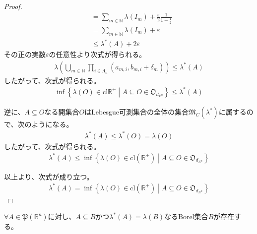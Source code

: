 \documentclass[dvipdfmx]{jsarticle}
\begin{document}
\begin{proof}
\begin{align*}
&= \sum_{m \in \mathbb{N}} {\lambda\left( I_{m} \right)} + \frac{\varepsilon}{2}\frac{1}{1 - \frac{1}{2}}\\
&= \sum_{m \in \mathbb{N}} {\lambda\left( I_{m} \right)} + \varepsilon\\
&\leq \lambda^{*}(A) + 2\varepsilon
\end{align*}
その正の実数$\varepsilon$の任意性より次式が得られる。
\begin{align*}
\lambda\left( \bigcup_{m \in \mathbb{N}} {\prod_{i \in \varLambda_{n}} \left( a_{m,i},b_{m,i} + \delta_{m} \right)} \right) \leq \lambda^{*}(A)
\end{align*}
したがって、次式が得られる。
\begin{align*}
\inf\left\{ \lambda(O) \in \mathrm{cl}\mathbb{R}^{+} \middle| A \subseteq O \in \mathfrak{O}_{d_{E^{n}}} \right\} \leq \lambda^{*}(A)
\end{align*}\par
逆に、$A \subseteq O$なる開集合$O$はLebesgue可測集合の全体の集合$\mathfrak{M}_{C}\left( \lambda^{*} \right)$に属するので、次のようになる。
\begin{align*}
\lambda^{*}(A) \leq \lambda^{*}(O) = \lambda(O)
\end{align*}
したがって、次式が得られる。
\begin{align*}
\lambda^{*}(A) \leq \inf\left\{ \lambda(O) \in \mathrm{cl}\left( \mathbb{R}^{+} \right) \middle| A \subseteq O \in \mathfrak{O}_{d_{E^{n}}} \right\}
\end{align*}\par
以上より、次式が成り立つ。
\begin{align*}
\lambda^{*}(A) = \inf\left\{ \lambda(O) \in \mathrm{cl}\left( \mathbb{R}^{+} \right) \middle| A \subseteq O \in \mathfrak{O}_{d_{E^{n}}} \right\}
\end{align*}
\end{proof}
\begin{thm}\label{4.5.4.13}
$\forall A \in \mathfrak{P}\left( \mathbb{R}^{n} \right)$に対し、$A \subseteq B$かつ$\lambda^{*}(A) = \lambda(B)$なるBorel集合$B$が存在する。
\end{thm}
\end{document}
